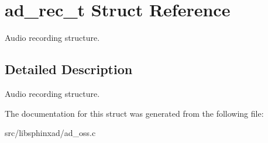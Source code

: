 \section{ad\+\_\+rec\+\_\+t Struct Reference}
\label{structad__rec__t}


Audio recording structure.  




\subsection{Detailed Description}
Audio recording structure. 

The documentation for this struct was generated from the following file\+:\begin{DoxyCompactItemize}
\item 
src/libsphinxad/ad\+\_\+oss.\+c\end{DoxyCompactItemize}
